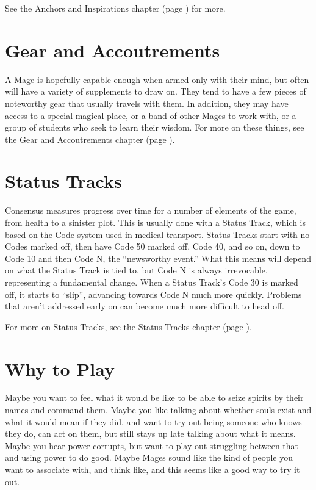\documentclass[
  oneside,
  statementpaper,
  9pt]{memoir}
\begin{document}
See the Anchors and Inspirations chapter (page \pageref{Anchors and Inspirations chapter}) for more.

\hypertarget{gear-and-accoutrements}{%
\section{Gear and Accoutrements}\label{gear-and-accoutrements}}

A Mage is hopefully capable enough when armed only with their mind, but often will have a variety of supplements to draw on. They tend to have a few pieces of noteworthy gear that usually travels with them. In addition, they may have access to a special magical place, or a band of other Mages to work with, or a group of students who seek to learn their wisdom. For more on these things, see the Gear and Accoutrements chapter (page \pageref{Gear and Accoutrements chapter}).

\hypertarget{status-tracks}{%
\section{Status Tracks}\label{status-tracks}}

Consensus measures progress over time for a number of elements of the
game, from health to a sinister plot. This is usually done with a Status
Track, which is based on the Code system used in medical transport.
Status Tracks start with no Codes marked off, then have Code 50 marked
off, Code 40, and so on, down to Code 10 and then Code N, the
``newsworthy event.'' What this means will depend on what the Status
Track is tied to, but Code N is always irrevocable, representing a
fundamental change. When a Status Track's Code 30 is marked off, it
starts to ``slip'', advancing towards Code N much more quickly. Problems
that aren't addressed early on can become much more difficult to head
off.

For more on Status Tracks, see the Status Tracks chapter (page \pageref{Status Tracks chapter}).

\hypertarget{why-to-play}{%
\section{Why to Play}\label{why-to-play}}

Maybe you want to feel what it would be like to be able to seize spirits
by their names and command them. Maybe you like talking about whether
souls exist and what it would mean if they did, and want to try out
being someone who knows they do, can act on them, but still stays up
late talking about what it means. Maybe you hear power corrupts, but
want to play out struggling between that and using power to do good.
Maybe Mages sound like the kind of people you want to associate with,
and think like, and this seems like a good way to try it out.
\end{document}
